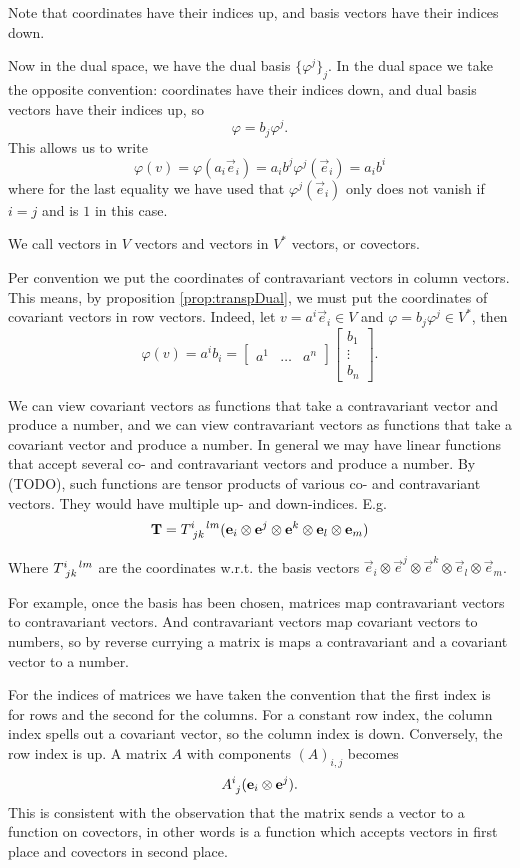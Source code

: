 Note that coordinates have their indices up, and basis vectors have their indices down.

Now in the dual space, we have the dual basis $\{\varphi^j\}_j$. In the dual space we take the opposite convention: coordinates have their indices down, and dual basis vectors have their indices up, so
\[ \varphi = b_j \varphi^j. \]
This allows us to write
\[ \varphi(v) = \varphi(a_i \vec{e}_i) = a_i b^j \varphi^j(\vec{e}_i) = a_i b^i \]
where for the last equality we have used that $\varphi^j(\vec{e}_i)$ only does not vanish if $i=j$ and is $1$ in this case.

We call vectors in $V$  vectors and vectors in $V^*$  vectors, or covectors.

Per convention we put the coordinates of contravariant vectors in column vectors. This means, by proposition \ref{prop:transpDual}, we must put the coordinates of covariant vectors in row vectors. Indeed, let $v=a^i \vec{e}_i\in V$ and $\varphi = b_j\varphi^j \in V^*$, then
\[ \varphi(v) = a^ib_i = \begin{bmatrix}
a^1 & \hdots & a^n
\end{bmatrix}\begin{bmatrix}
b_1 \\ \vdots  \\ b_n
\end{bmatrix}. \]

We can view covariant vectors as functions that take a contravariant vector and produce a number, and we can view contravariant vectors as functions that take a covariant vector and produce a number. In general we may have linear functions that accept several co- and contravariant vectors and produce a number. By (TODO), such functions are tensor products of various co- and contravariant vectors. They would have multiple up- and down-indices. E.g.
\[ \vec{T} = \tensor{T}{^i_j_k^l^m}(\vec{e}_i\otimes \vec{e}^j\otimes \vec{e}^k\otimes \vec{e}_l \otimes \vec{e}_m) \]

Where $\tensor{T}{^i_j_k^l^m}$ are the coordinates w.r.t. the basis vectors $\vec{e}_i\otimes \vec{e}^j\otimes \vec{e}^k \otimes\vec{e}_l \otimes \vec{e}_m$.

For example, once the basis has been chosen, matrices map contravariant vectors to contravariant vectors. And contravariant vectors map covariant vectors to numbers, so by reverse currying a matrix is maps a contravariant and a covariant vector to a number.

For the indices of matrices we have taken the convention that the first index is for rows and the second for the columns. For a constant row index, the column index spells out a covariant vector, so the column index is down. Conversely, the row index is up. A matrix $A$ with components $(A)_{i,j}$ becomes
\[ \tensor{A}{^i_j}(\vec{e}_i\otimes \vec{e}^j). \]
This is consistent with the observation that the matrix sends a vector to a function on covectors, in other words is a function which accepts vectors in first place and covectors in second place.

